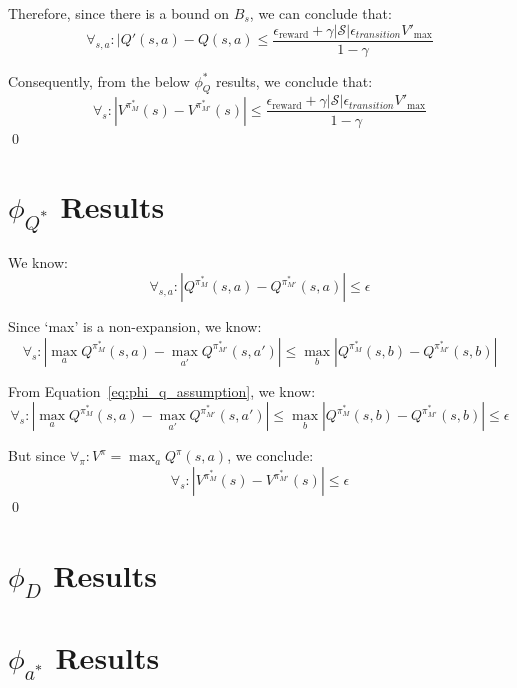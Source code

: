\documentclass[11pt]{amsart}
\begin{document}
Therefore, since there is a bound on $B_s$, we can conclude that:
\begin{equation}
\forall_{s,a} : |Q'(s,a) - Q(s,a) \leq \frac{{\epsilon_{\text{reward}}} + \gamma |\mathcal{S}|\epsilon_{transition}V'_{\text{max}}}{1-\gamma}
\end{equation}

Consequently, from the below $\phi_Q^*$ results, we conclude that:
\begin{equation}
\forall_s : |V^{\pi^*_M}(s) - V^{\pi^*_{M'}}(s)| \leq \frac{{\epsilon_{\text{reward}}} + \gamma |\mathcal{S}|\epsilon_{transition}V'_{\text{max}}}{1-\gamma}
\end{equation}
\qed


\newpage
\section{$\phi_{Q^*}$ Results}

We know:
\begin{equation}
\forall_{s,a} : | Q^{\pi^*_M}(s,a) - Q^{\pi^*_{M'}}(s,a)| \leq \epsilon
\label{eq:phi_q_assumption}
\end{equation}

Since `max' is a non-expansion, we know:
\begin{equation}
\forall_s : |\max_a Q^{\pi^*_M}(s,a) - \max_{a'} Q^{\pi^*_{M'}}(s,a')| \leq \max_b | Q^{\pi^*_M}(s,b) - Q^{\pi^*_{M'}}(s,b)|
\end{equation}

From Equation~\ref{eq:phi_q_assumption}, we know:
\begin{equation}
\forall_s : |\max_a Q^{\pi^*_M}(s,a) - \max_{a'} Q^{\pi^*_{M'}}(s,a')| \leq \max_b | Q^{\pi^*_M}(s,b) - Q^{\pi^*_{M'}}(s,b)| \leq \epsilon
\end{equation}

But since $\forall_\pi : V^{\pi} = \max_a Q^\pi(s,a)$, we conclude:
\begin{equation}
\forall_s : |V^{\pi^*_M}(s) - V^{\pi^*_{M'}}(s)| \leq \epsilon
\end{equation}
\qed

\newpage
\section{$\phi_{D}$ Results}

\newpage
\section{$\phi_{a^*}$ Results}




\newpage

\end{document}
